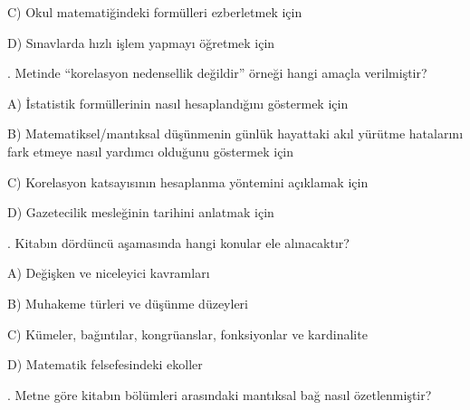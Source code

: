 \par\noindent\hspace*{1.6em}C) Okul matematiğindeki formülleri ezberletmek için

\par\noindent\hspace*{1.6em}D) Sınavlarda hızlı işlem yapmayı öğretmek için

\par\smallskip{}. Metinde “korelasyon nedensellik değildir” örneği hangi amaçla verilmiştir?

\par\noindent\hspace*{1.6em}A) İstatistik formüllerinin nasıl hesaplandığını göstermek için

\par\noindent\hspace*{1.6em}B) Matematiksel/mantıksal düşünmenin günlük hayattaki akıl yürütme hatalarını fark etmeye nasıl yardımcı olduğunu göstermek için

\par\noindent\hspace*{1.6em}C) Korelasyon katsayısının hesaplanma yöntemini açıklamak için

\par\noindent\hspace*{1.6em}D) Gazetecilik mesleğinin tarihini anlatmak için

\par\smallskip{}. Kitabın dördüncü aşamasında hangi konular ele alınacaktır?

\par\noindent\hspace*{1.6em}A) Değişken ve niceleyici kavramları

\par\noindent\hspace*{1.6em}B) Muhakeme türleri ve düşünme düzeyleri

\par\noindent\hspace*{1.6em}C) Kümeler, bağıntılar, kongrüanslar, fonksiyonlar ve kardinalite

\par\noindent\hspace*{1.6em}D) Matematik felsefesindeki ekoller

\par\smallskip{}. Metne göre kitabın bölümleri arasındaki mantıksal bağ nasıl özetlenmiştir?

